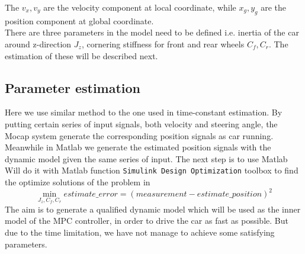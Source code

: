 The $v_x,v_y$ are the velocity component at local coordinate, while $x_g, y_g$ are the position component at global coordinate.\\
There are three parameters in the model need to be defined i.e.  inertia of the car around z-direction $J_z$, cornering stiffness for front and rear wheels $C_f, C_r$. The estimation of these will be described next.

\subsection{Parameter estimation}

Here we use similar method to the one used in time-constant estimation. By putting certain series of input signals, both velocity and steering angle, the Mocap system generate the corresponding position signals as car running. Meanwhile in Matlab we generate the estimated position signals with the dynamic model given the same series of input.
The next step is to use Matlab
Will do it with Matlab function \texttt{Simulink Design Optimization} toolbox to find the optimize solutions of the problem in
\begin{equation}
  \min_{J_z, C_f, C_r} estimate\_error = (measurement - estimate\_position)^2
\end{equation}
The aim is to generate a qualified dynamic model which will be used as the inner model of the MPC controller, in order to drive the car as fast as possible. But due to the time limitation, we have not manage to achieve some satisfying parameters.

